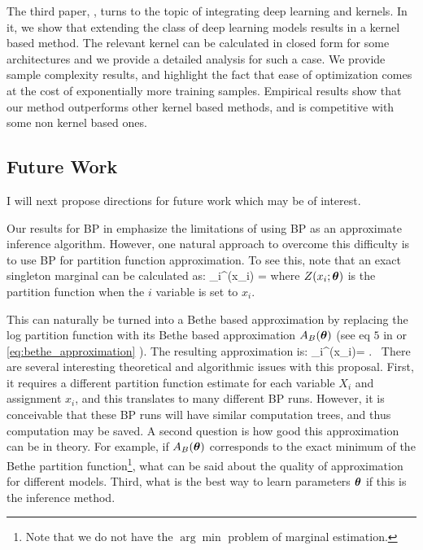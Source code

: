 The third paper, , turns to the topic of integrating deep learning and kernels.
In it, we show that extending the class of deep learning models results in a kernel based method.
The relevant kernel can be calculated in closed form for some architectures and we provide a detailed analysis for such a case.
We provide sample complexity results, and highlight the fact that ease of optimization comes at the cost of exponentially more training samples.
Empirical results show that our method outperforms other kernel based methods, and is competitive with some non kernel based ones.  


\subsection{Future Work}
I will next propose directions for future work which may be of interest.

Our results for BP in  emphasize the limitations of using BP as an approximate inference algorithm. However, one natural approach to overcome this difficulty is to use BP for partition function approximation. To see this, note that an exact singleton marginal can be calculated as:
\be
\mu_i^{\thetav}(x_i) = 
\label{eq:marg_partition}
\ee
where $Z(x_i;\boldsymbol{\theta})$ 
is the partition function when the $i$ variable is set to $x_i$.  

This can naturally be turned into a Bethe based approximation by replacing the log partition function with its Bethe based approximation $A_B(\boldsymbol{\theta})$ (see eq $5$ in  or \eqref{eq:bethe_approximation} ). The resulting approximation is:
\be
\tau_i^{\thetav}(x_i)=  .~
\ee
There are several interesting theoretical and algorithmic issues with this proposal. First, it requires a different partition function estimate for each variable $X_i$ and assignment $x_i$, and this translates to many different BP runs. However, it is conceivable that these BP runs will have similar computation trees, and thus computation may be saved. A second question is how good this approximation can be in theory. For example, if $A_B(\boldsymbol{\theta})$ corresponds to the exact minimum of the Bethe partition function\footnote{Note that we do not have the $\arg\min$ problem of marginal estimation.}, what can be said about the quality of approximation for different models. Third, what is the best way to learn parameters $\boldsymbol{\theta}$ if this is the inference method.

